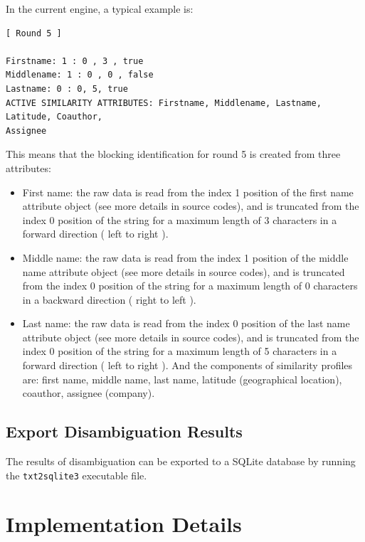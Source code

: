 \documentclass{article}
\begin{document}
In the current engine, a typical example is:

\begin{verbatim}
[ Round 5 ]

Firstname: 1 : 0 , 3 , true
Middlename: 1 : 0 , 0 , false
Lastname: 0 : 0, 5, true
ACTIVE SIMILARITY ATTRIBUTES: Firstname, Middlename, Lastname, Latitude, Coauthor,
Assignee
\end{verbatim}


This means that the blocking identification for round 5 is 
created from three attributes:

\begin{itemize}

\item First name: the raw data is read from the index 1 position 
of the first name attribute object (see more details in source codes), 
and is truncated from the index 0 position of the string for a
maximum length of 3 characters in a forward direction ( left to right ).

\item Middle name: the raw data is read from the index 1 position 
of the middle name attribute object (see more details in source codes), 
and is truncated from the index 0 position of the string for a
maximum length of 0 characters in a backward direction ( right to left ).

\item Last name: the raw data is read from the index 0 position of
the last name attribute object (see more details in source codes), 
and is truncated from the index 0 position of the string for a
maximum length of 5 characters in a forward direction ( left to right ).
And the components of similarity profiles are: first name, middle name,
last name, latitude (geographical location), coauthor, assignee (company).

\end{itemize}

\subsection{Export Disambiguation Results}

The results of disambiguation can be exported to a 
SQLite database by running the \texttt{txt2sqlite3}
executable file.



\section{Implementation Details}
\end{document}

